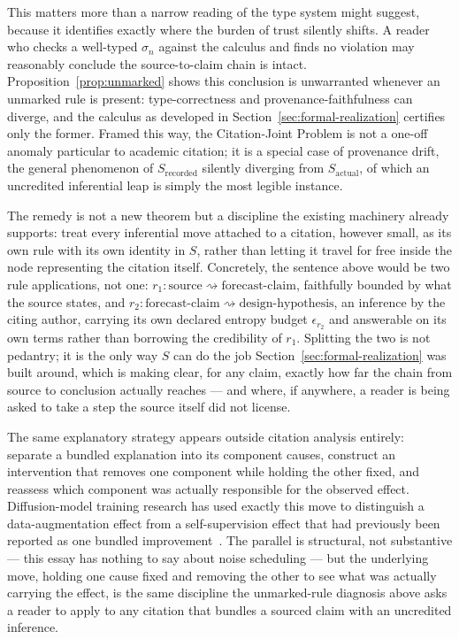 \documentclass[11pt]{article}
\theoremstyle{definition}
\begin{document}
This matters more than a narrow reading of the type system might suggest, because it identifies exactly where the burden of trust silently shifts. A reader who checks a well-typed $\sigma_n$ against the calculus and finds no violation may reasonably conclude the source-to-claim chain is intact. Proposition~\ref{prop:unmarked} shows this conclusion is unwarranted whenever an unmarked rule is present: type-correctness and provenance-faithfulness can diverge, and the calculus as developed in Section~\ref{sec:formal-realization} certifies only the former. Framed this way, the Citation-Joint Problem is not a one-off anomaly particular to academic citation; it is a special case of provenance drift, the general phenomenon of $S_{\mathrm{recorded}}$ silently diverging from $S_{\mathrm{actual}}$, of which an uncredited inferential leap is simply the most legible instance.

The remedy is not a new theorem but a discipline the existing machinery already supports: treat every inferential move attached to a citation, however small, as its own rule with its own identity in $S$, rather than letting it travel for free inside the node representing the citation itself. Concretely, the sentence above would be two rule applications, not one: $r_1 : \text{source} \rightsquigarrow \text{forecast-claim}$, faithfully bounded by what the source states, and $r_2 : \text{forecast-claim} \rightsquigarrow \text{design-hypothesis}$, an inference by the citing author, carrying its own declared entropy budget $\epsilon_{r_2}$ and answerable on its own terms rather than borrowing the credibility of $r_1$. Splitting the two is not pedantry; it is the only way $S$ can do the job Section~\ref{sec:formal-realization} was built around, which is making clear, for any claim, exactly how far the chain from source to conclusion actually reaches --- and where, if anywhere, a reader is being asked to take a step the source itself did not license.

The same explanatory strategy appears outside citation analysis entirely: separate a bundled explanation into its component causes, construct an intervention that removes one component while holding the other fixed, and reassess which component was actually responsible for the observed effect. Diffusion-model training research has used exactly this move to distinguish a data-augmentation effect from a self-supervision effect that had previously been reported as one bundled improvement~\cite{selfflow2026}. The parallel is structural, not substantive --- this essay has nothing to say about noise scheduling --- but the underlying move, holding one cause fixed and removing the other to see what was actually carrying the effect, is the same discipline the unmarked-rule diagnosis above asks a reader to apply to any citation that bundles a sourced claim with an uncredited inference.
\end{document}
